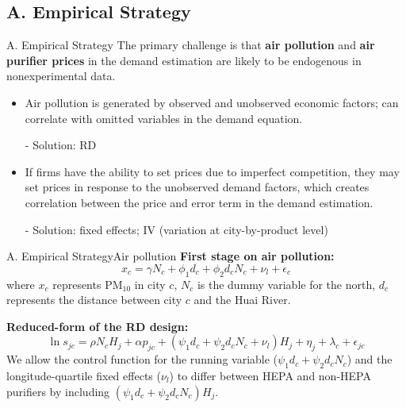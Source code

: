 \documentclass{beamer}
\begin{document}
\subsection{A. Empirical Strategy}
\begin{frame}[shrink]
	\transfade
	\tableofcontents[sectionstyle=show/shaded,subsectionstyle=show/shaded/hide]
	\addtocounter{framenumber}{-1}
\end{frame}
\begin{frame}{A. Empirical Strategy}
	The primary challenge is that \textbf{air pollution} and \textbf{air purifier prices} in the demand estimation are likely to be endogenous in nonexperimental data. 
	\begin{itemize}
		\item Air pollution is generated by observed and unobserved economic factors; can correlate with omitted variables in the demand equation.
		\item [-] Solution: RD
		\item If firms have the ability to set prices due to imperfect competition, they may set prices in response to the unobserved demand factors, which creates correlation between the price and error term in the demand estimation.
		\item [-] Solution: fixed effects; IV (variation at city-by-product level)
	\end{itemize}
\end{frame}
\begin{frame}{A. Empirical Strategy}{Air pollution}
	\textbf{First stage on air pollution:}
	\begin{equation}
		x_c=\gamma N_c+\phi_1d_c+\phi_2d_cN_c+\nu_l+\epsilon_c
	\end{equation}
	where $x_c$ represents PM$_{10}$ in city $c$, $N_c$ is the dummy variable for the north, $d_c$ represents the distance between city $c$ and the Huai River. \hyperlink{balancetest}{}
	\medskip

	\textbf{Reduced-form of the RD design:}
	\begin{equation}
		\ln s_{jc}=\rho N_cH_j+\alpha p_{jc}+(\psi_1d_c+\psi_2d_cN_c+\nu_l)H_j+\eta_j+\lambda_c+\epsilon_{jc}
	\end{equation}
	We allow the control function for the running variable ($\psi_1d_c+\psi_2d_cN_c$) and the longitude-quartile fixed effects ($\nu_l$) to differ between HEPA and non-HEPA purifiers by including $(\psi_1d_c+\psi_2d_cN_c)H_j$.
\end{frame}
\end{document}
